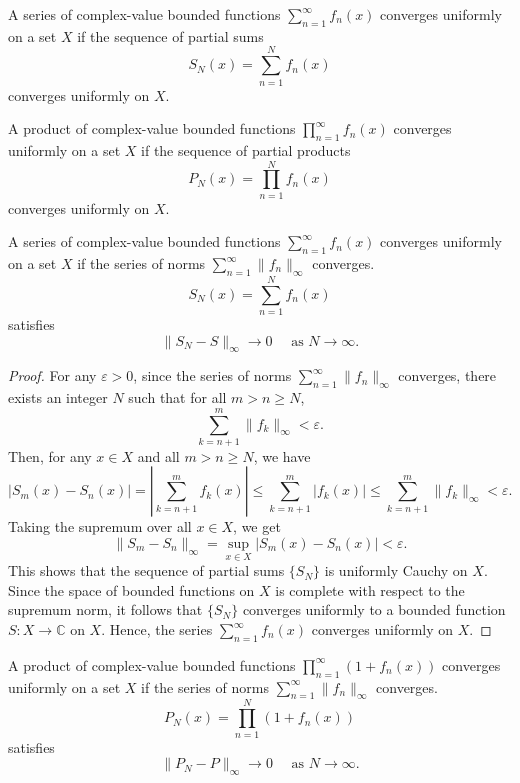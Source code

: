 \documentclass{elegantbook}
\begin{document}
\begin{definition}
  A series of complex-value bounded functions $\sum_{n=1}^{\infty} f_n(x)$ converges uniformly on a set $X$ if the sequence of partial sums
  \[
    S_N(x) = \sum_{n=1}^{N} f_n(x)
  \]
  converges uniformly on $X$.
\end{definition}

\begin{definition}
  A product of complex-value bounded functions $\prod_{n=1}^{\infty} f_n(x)$ converges uniformly on a set $X$ if the sequence of partial products
  \[
    P_N(x) = \prod_{n=1}^{N} f_n(x)
  \]
  converges uniformly on $X$.
\end{definition}

\begin{theorem}
  A series of complex-value bounded functions $\sum_{n=1}^{\infty} f_n(x)$ converges uniformly on a set $X$ if the series of norms $\sum_{n=1}^{\infty} \|f_n\|_{\infty}$ converges.
  \[
    S_N(x) = \sum_{n=1}^{N} f_n(x)
  \]
  satisfies
  \[
    \|S_N - S\|_{\infty} \to 0 \quad \text{ as } N \to \infty.
  \]
\end{theorem}

\begin{proof}
  For any $\varepsilon > 0$, since the series of norms $\sum_{n=1}^{\infty} \|f_n\|_{\infty}$ converges, there exists an integer $N$ such that for all $m > n \geq N$,
  \[
    \sum_{k=n+1}^{m} \|f_k\|_{\infty} < \varepsilon.
  \]
  Then, for any $x \in X$ and all $m > n \geq N$, we have
  \[
    |S_m(x) - S_n(x)| = \left|\sum_{k=n+1}^{m} f_k(x)\right| \leq \sum_{k=n+1}^{m} |f_k(x)| \leq \sum_{k=n+1}^{m} \|f_k\|_{\infty} < \varepsilon.
  \]
  Taking the supremum over all $x \in X$, we get
  \[
    \|S_m - S_n\|_{\infty} = \sup_{x \in X} |S_m(x) - S_n(x)| < \varepsilon.
  \]
  This shows that the sequence of partial sums $\{S_N\}$ is uniformly Cauchy on $X$. Since the space of bounded functions on $X$ is complete with respect to the supremum norm, it follows that $\{S_N\}$ converges uniformly to a bounded function $S:X\to\mathbb{C}$ on $X$. Hence, the series $\sum_{n=1}^{\infty} f_n(x)$ converges uniformly on $X$.
\end{proof}

\begin{theorem}
  A product of complex-value bounded functions $\prod_{n=1}^{\infty} (1 + f_n(x))$ converges uniformly on a set $X$ if the series of norms $\sum_{n=1}^{\infty} \|f_n\|_{\infty}$ converges.
  \[
    P_N(x) = \prod_{n=1}^{N} (1 + f_n(x))
  \]
  satisfies
  \[
    \|P_N - P\|_{\infty} \to 0 \quad \text{ as } N \to \infty.
  \]
\end{theorem}
\end{document}
